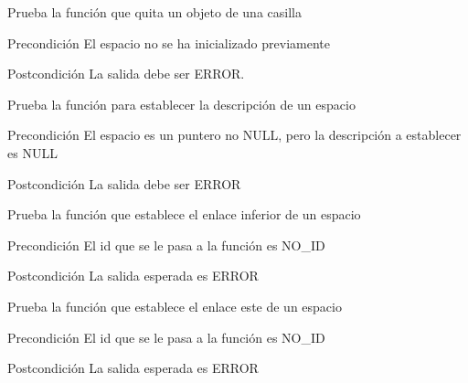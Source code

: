 \begin{DoxyRefList}
\item[\label{test__test000309}%
\hypertarget{test__test000309}{}%
Global \hyperlink{space__test_8c_a57abe29562a523c41c966b9a656887b8}{test3\-\_\-space\-\_\-remove\-\_\-object} ()]Prueba la función que quita un objeto de una casilla \begin{DoxyPrecond}{Precondición}
El espacio no se ha inicializado previamente 
\end{DoxyPrecond}
\begin{DoxyPostcond}{Postcondición}
La salida debe ser E\-R\-R\-O\-R.  
\end{DoxyPostcond}

\item[\label{test__test000247}%
\hypertarget{test__test000247}{}%
Global \hyperlink{space__test_8c_a2599e2fdd9abd61c410faeca649402e6}{test3\-\_\-space\-\_\-set\-\_\-description} ()]Prueba la función para establecer la descripción de un espacio \begin{DoxyPrecond}{Precondición}
El espacio es un puntero no N\-U\-L\-L, pero la descripción a establecer es N\-U\-L\-L 
\end{DoxyPrecond}
\begin{DoxyPostcond}{Postcondición}
La salida debe ser E\-R\-R\-O\-R  
\end{DoxyPostcond}

\item[\label{test__test000270}%
\hypertarget{test__test000270}{}%
Global \hyperlink{space__test_8c_a38591396f4d83f2f2783de8944fe93eb}{test3\-\_\-space\-\_\-set\-\_\-down} ()]Prueba la función que establece el enlace inferior de un espacio \begin{DoxyPrecond}{Precondición}
El id que se le pasa a la función es N\-O\-\_\-\-I\-D 
\end{DoxyPrecond}
\begin{DoxyPostcond}{Postcondición}
La salida esperada es E\-R\-R\-O\-R  
\end{DoxyPostcond}

\item[\label{test__test000261}%
\hypertarget{test__test000261}{}%
Global \hyperlink{space__test_8c_adf98486d8745110660515d14b71b5656}{test3\-\_\-space\-\_\-set\-\_\-east} ()]Prueba la función que establece el enlace este de un espacio \begin{DoxyPrecond}{Precondición}
El id que se le pasa a la función es N\-O\-\_\-\-I\-D 
\end{DoxyPrecond}
\begin{DoxyPostcond}{Postcondición}
La salida esperada es E\-R\-R\-O\-R  
\end{DoxyPostcond}


\end{DoxyRefList}
